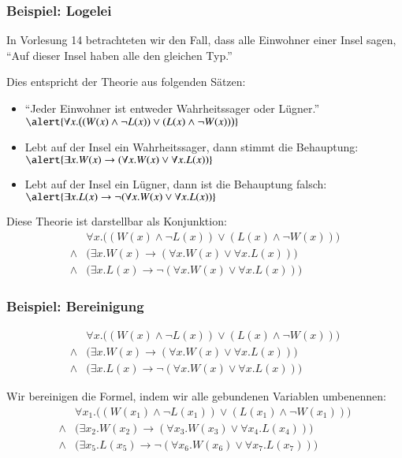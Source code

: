 \documentclass[aspectratio=1610,onlymath]{beamer}
\begin{document}
\begin{frame}\frametitle{Beispiel: Logelei}

In Vorlesung 14 betrachteten wir den Fall, dass alle Einwohner einer Insel sagen,
"`Auf dieser Insel haben alle den gleichen Typ."'\bigskip

Dies entspricht der Theorie aus folgenden Sätzen:
\begin{itemize}
\item "`Jeder Einwohner ist entweder Wahrheitssager oder Lügner."'\\
	$\alert{\forall x.\big((W(x)\wedge\neg L(x))\vee (L(x)\wedge\neg W(x))\big)}$
\item Lebt auf der Insel ein Wahrheitssager, dann stimmt die Behauptung:\\
	$\alert{\exists x.W(x)\to(\forall x.W(x) \vee \forall x.L(x))}$
\item Lebt auf der Insel ein Lügner, dann ist die Behauptung falsch:\\
	$\alert{\exists x.L(x)\to\neg(\forall x.W(x) \vee \forall x.L(x))}$
\end{itemize}\medskip\pause

Diese Theorie ist darstellbar als Konjunktion:
\begin{align*}
& \forall x.\big((W(x)\wedge\neg L(x))\vee (L(x)\wedge\neg W(x))\big)\\
{}\wedge{} & \big(\exists x.W(x)\to(\forall x.W(x) \vee \forall x.L(x))\big) \\
{}\wedge{} & \big(\exists x.L(x)\to\neg(\forall x.W(x) \vee \forall x.L(x))\big)
\end{align*}


\end{frame}

\begin{frame}\frametitle{Beispiel: Bereinigung}

\begin{align*}
& \forall x.\big((W(x)\wedge\neg L(x))\vee (L(x)\wedge\neg W(x))\big)\\
{}\wedge{} & \big(\exists x.W(x)\to(\forall x.W(x) \vee \forall x.L(x))\big) \\
{}\wedge{} & \big(\exists x.L(x)\to\neg(\forall x.W(x) \vee \forall x.L(x))\big)
\end{align*}\pause

Wir bereinigen die Formel, indem wir alle gebundenen Variablen umbenennen:
\begin{align*}
& \forall x_1.\big((W(x_1)\wedge\neg L(x_1))\vee (L(x_1)\wedge\neg W(x_1))\big)\\
{}\wedge{} & \big(\exists x_2.W(x_2)\to(\forall x_3.W(x_3) \vee \forall x_4.L(x_4))\big) \\
{}\wedge{} & \big(\exists x_5.L(x_5)\to\neg(\forall x_6.W(x_6) \vee \forall x_7.L(x_7))\big)
\end{align*}

\end{frame}
\end{document}
